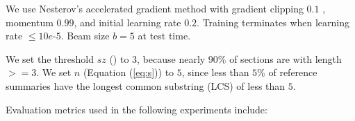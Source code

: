 We use Nesterov's
accelerated gradient method \cite{SutskeverMDH13} with gradient clipping $0.1$ \cite{PascanuMB13}, momentum $0.99$,
and initial learning rate $0.2$.
Training terminates when learning rate $\le 10e$-$5$.
Beam size $b=5$ at test time.

We set the threshold $sz$ () to $3$, 
because nearly $90\%$ 
of sections are with length$>=$3.
We set $n$ (Equation (\ref{eq:s})) to $5$,
since less than $5\%$ of reference summaries have
the longest common substring (LCS) of less than $5$.

Evaluation metrics used in the following experiments include:

